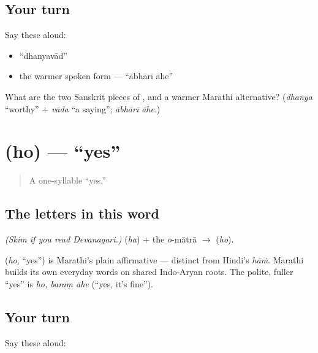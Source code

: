 \subsection*{Your turn}
Say these aloud:

\begin{itemize}
\raggedright
  \item \textquotedblleft{}dhanyavād\textquotedblright{}
  \item the warmer spoken form — \textquotedblleft{}ābhārī āhe\textquotedblright{}
\end{itemize}

\begin{tcolorbox}[breakable,colback=teal!4,colframe=teal!35!black,title={Before you move on}]
What are the two Sanskrit pieces of \textbf{}, and a warmer Marathi alternative? (\emph{dhanya} \textquotedblleft{}worthy\textquotedblright{} + \emph{vāda} \textquotedblleft{}a saying\textquotedblright{}; \emph{ābhārī āhe}.)
\end{tcolorbox}
\section[ho]{ (ho) — \textquotedblleft{}yes\textquotedblright{}}

\label{lesson:MR-C01-ho}



\begin{quote}
A one-syllable \textquotedblleft{}yes.\textquotedblright{}
\end{quote}

\subsection*{The letters in this word}
\emph{(Skim if you read Devanagari.)} \textbf{} (\emph{ha}) + the \emph{o}-mātrā \textbf{} $\to$ \textbf{} (\emph{ho}).

\begin{cousinweb}
\textbf{} (\emph{ho}, \textquotedblleft{}yes\textquotedblright{}) is Marathi's plain affirmative — distinct from Hindi's \emph{hāṁ}. Marathi builds its own everyday words on shared Indo-Aryan roots. The polite, fuller \textquotedblleft{}yes\textquotedblright{} is \emph{ho, baraṃ āhe} (\textquotedblleft{}yes, it's fine\textquotedblright{}).
\end{cousinweb}

\subsection*{Your turn}
Say these aloud:

